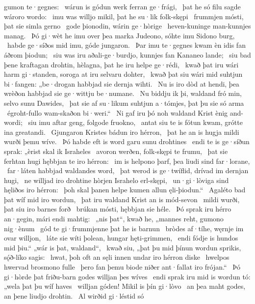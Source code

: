 gumon te·gegnes: \hld\ wárun is gódun werk
ferran ge·frági, \hld\ þat he só filu sagde
wároro wordo: \hld\ imu was willjo mikil,
þat he su·lik folk-skępi \hld\ frummjen mósti,
þat sie simla gerno \hld\ gode þionodin,
wárin ge·hòrige \hld\ heven-kuninge
man-kunnjes manag. \hld\ Þó gi·wèt he imu over þea marka Judeono,
sóhte imu Sidono burg, \hld\ habde ge·síðos mid imu,
góde jungaron. \hld\ Þar imu te·gegnes kwam
èn idis fan áðrom þiodun; \hld\ siu was iru aðali-ge·burdjo,
kunnjes fan Kananeo lande; \hld\ siu bad þene kraftagan drohtin,
hèlagna, þat he iru helpe ge·rédi, \hld\ kwað þat iru wári harm gi·standen,
soroga at iru selvaru dohter, \hld\ kwað þat siu wári mid suhtjun bi·fangen:
„be·drogan habbjad sie dernja wihti. \hld\ Nu is iro dòd at hendi,
þea wrèðon habbjad sie ge·wittju be·numane. \hld\ Nu biddju ik þi, waldand fró min,
selvo sunu Dawides, \hld\ þat sie af su·likum suhtjun a·tómjes,
þat þu sie só arma \hld\ égroht-fullo
wam-skaðon bi·weri.“ \hld\ Ni gaf iru þó noh waldand Krist
ènig and-wordi; \hld\ siu imu aftar geng,
folgode fruokno, \hld\ antat siu te is fótun kwam,
grótte ina greatandi. \hld\ Gjungaron Kristes
bádun iro hérron, \hld\ þat he an is hugja mildi
wurði þemu wíve. \hld\ Þó habde eft is word garu
sunu drohtines \hld\ endi te is ge·síðun sprak:
„èrist skal ik Israheles \hld\ avoron werðen,
folk-skępi te frumu, \hld\ þat sie ferhtan hugi
hębbjan te iro hérron: \hld\ im is helpono þarf,
þea liudi sind far·lorane, \hld\ far·láten habbjad
waldandes word, \hld\ þat werod is ge·twíflid,
drívad im dernjan hugi, \hld\ ne willjad iro drohtine hòrjen
Israhelo erl-skępi, \hld\ un·gi·lòviga sind
hęliðos iro hérron: \hld\ þoh skal þanen helpe kumen
allun ęli-þiodun.“ \hld\ Agaléto bad
þat wíf mid iro wordun, \hld\ þat iru waldand Krist
an is mód-sevon \hld\ mildi wurði,
þat siu iro barnes forð \hld\ brúkan mósti,
hębbjan sie héle. \hld\ Þó sprak iru hérro an·gegin,
mári endi mahtig: \hld\ „nis þat“, kwað he, „mannes reht,
gumono nig·ènum \hld\ gód te gi·frummjenne
þat he is barnun \hld\ bròdes af·tíhe,
węrnje im ovar willjon, \hld\ láte sie wíti þolean,
hungar hęti-grimmen, \hld\ endi fódje is hundos mid þiu.“
„wár is þat, waldand“, \hld\ kwað siu, „þat þu mid þínun wordun sprikis,
sǫ́ð-líko sagis: \hld\ hwat, þoh oft an sęli innen
undar iro hérron diske \hld\ hwelpos hwervad
brosmono fulle \hld\ þero fan þemu biode niðer
ant·fallat iro frójan.“ \hld\ Þó gi·hòrde þat friðu-barn godes
willjan þes wíves \hld\ endi sprak iru mid is wordun tó:
„wela þat þu wíf haves \hld\ willjan góden!
Mikil is þín gi·lòvo \hld\ an þea maht godes,
an þene liudjo drohtin. \hld\ Al wirðid gi·léstid só
